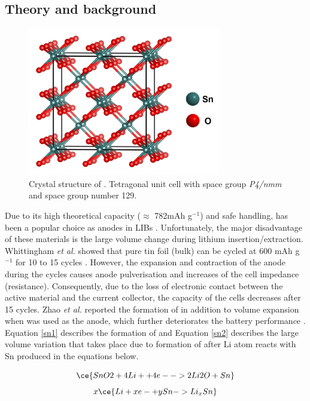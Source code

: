 \subsection{Theory and background}
\begin{figure}[th!]
  \centering
  \includegraphics[width=0.75\textwidth]{Figures/chap6fig/SnO2crys}
    \caption{Crystal structure of . Tetragonal unit cell with space group \textit{P4/nmm} and space group number 129.}
  \label{Figures/chap6fig:SnO2crys}
  \end{figure}
Due to its high theoretical capacity ($\approx$ 782mAh g$^{-1}$) and safe handling,  has been a popular choice as anodes in LIBs  \cite{idota_tin-based_1997}. Unfortunately, the major disadvantage of these materials is the large volume change during lithium insertion/extraction. Whittingham \textit{et al.} showed that pure tin foil (bulk) can be cycled at 600 mAh g$^{-1}$ for 10 to 15 cycles \cite{yang_anodes_2003}. However, the expansion and contraction of the anode during the cycles causes anode pulverisation and increases of the cell impedance (resistance). Consequently, due to the loss of electronic contact between the active material and the current collector, the capacity of the cells decreases after 15 cycles. Zhao \textit{et al.} reported the formation of  in addition to volume expansion when  was used as the anode, which further deteriorates the battery performance \cite{zhao_tin-based_2016}. Equation \ref{sn1} describes the formation of  and Equation \ref{sn2} describes the large volume variation that takes place due to formation of  after Li atom reacts with Sn produced in the equations below.

\begin{equation}\label{sn1}
\ce{SnO2 + 4Li+ + 4e- -> 2Li2O + Sn} 
\end{equation}
\begin{equation}\label{sn2}
x\ce{Li + xe- + ySn -> Li_{x}Sn} 
\end{equation}

